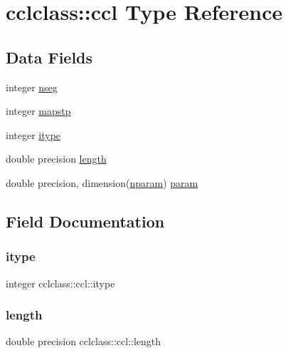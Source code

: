 \hypertarget{structcclclass_1_1ccl}{}\section{cclclass\+::ccl Type Reference}
\label{structcclclass_1_1ccl}
\subsection*{Data Fields}
\begin{DoxyCompactItemize}
\item 
integer \mbox{\hyperlink{structcclclass_1_1ccl_a37e0a279ff69258948ddecf0a4c78045}{nseg}}
\item 
integer \mbox{\hyperlink{structcclclass_1_1ccl_a5d663b5eeafc5a924cfe6383143f9b0a}{mapstp}}
\item 
integer \mbox{\hyperlink{structcclclass_1_1ccl_ac0907eebcd93b9aa41c33858f394496d}{itype}}
\item 
double precision \mbox{\hyperlink{structcclclass_1_1ccl_a128d51138685ec33b8c0c7f6bd89dc81}{length}}
\item 
double precision, dimension(\mbox{\hyperlink{namespacecclclass_adeb399ff41e54cda7bdefa51063c0de6}{nparam}}) \mbox{\hyperlink{structcclclass_1_1ccl_a4b800d069f005c436b2295924f8f7bb9}{param}}
\end{DoxyCompactItemize}


\subsection{Field Documentation}
\mbox{\label{structcclclass_1_1ccl_ac0907eebcd93b9aa41c33858f394496d}} 
\subsubsection{\texorpdfstring{itype}{itype}}
{\footnotesize\ttfamily integer cclclass\+::ccl\+::itype}

\mbox{\label{structcclclass_1_1ccl_a128d51138685ec33b8c0c7f6bd89dc81}} 
\subsubsection{\texorpdfstring{length}{length}}
{\footnotesize\ttfamily double precision cclclass\+::ccl\+::length}

